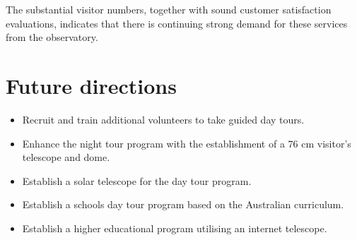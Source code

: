 \documentclass[version=last, paper=a4, DIV=18, usenames, dvipsnames]{scrartcl}
\begin{document}
The substantial visitor numbers, together with sound customer satisfaction evaluations, indicates that there is continuing strong demand for these services from the observatory.






\section{Future directions}



\begin{itemize}

  \item Recruit and train additional volunteers to take guided day tours.

  \item Enhance the night tour program with the establishment of a 76 cm visitor's telescope and dome.

  \item Establish a solar telescope for the day tour program.

  \item Establish a schools day tour program based on the Australian curriculum.

  \item Establish a higher educational program utilising an internet telescope.

\end{itemize}






\clearpage
\end{document}
